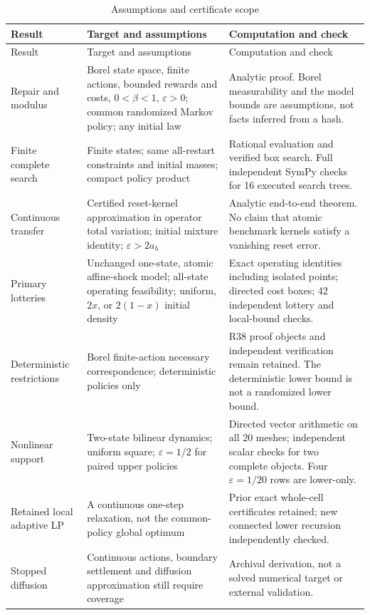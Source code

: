 \begin{longtable}{p{}p{}p{}}
\caption{Assumptions and certificate scope}\label{tab:assumptions}\\
\toprule Result & Target and assumptions & Computation and check \\ \midrule\endfirsthead
\toprule Result & Target and assumptions & Computation and check \\ \midrule\endhead
Repair and modulus & Borel state space, finite actions, bounded rewards and costs, $0<\beta<1$, $\varepsilon>0$; common randomized Markov policy; any initial law & Analytic proof. Borel measurability and the model bounds are assumptions, not facts inferred from a hash. \\
Finite complete search & Finite states; same all-restart constraints and initial masses; compact policy product & Rational evaluation and verified box search. Full independent SymPy checks for 16 executed search trees. \\
Continuous transfer & Certified reset-kernel approximation in operator total variation; initial mixture identity; $\varepsilon>2a_h$ & Analytic end-to-end theorem. No claim that atomic benchmark kernels satisfy a vanishing reset error. \\
Primary lotteries & Unchanged one-state, atomic affine-shock model; all-state operating feasibility; uniform, $2x$, or $2(1-x)$ initial density & Exact operating identities including isolated points; directed cost boxes; 42 independent lottery and local-bound checks. \\
Deterministic restrictions & Borel finite-action necessary correspondence; deterministic policies only & R38 proof objects and independent verification remain retained. The deterministic lower bound is not a randomized lower bound. \\
Nonlinear support & Two-state bilinear dynamics; uniform square; $\varepsilon=1/2$ for paired upper policies & Directed vector arithmetic on all 20 meshes; independent scalar checks for two complete objects. Four $\varepsilon=1/20$ rows are lower-only. \\
Retained local adaptive LP & A continuous one-step relaxation, not the common-policy global optimum & Prior exact whole-cell certificates retained; new connected lower recursion independently checked. \\
Stopped diffusion & Continuous actions, boundary settlement and diffusion approximation still require coverage & Archival derivation, not a solved numerical target or external validation. \\
\bottomrule
\end{longtable}

